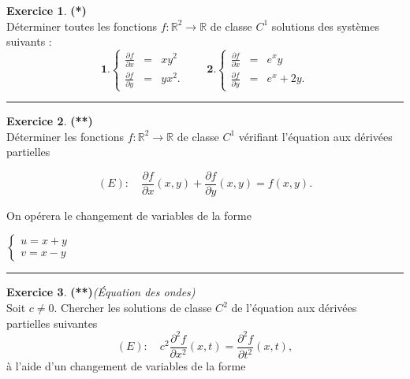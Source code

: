 \documentclass[a4paper,11pt]{article}
\theoremstyle{definition}
\newtheorem{exo}{Exercice} %
\begin{document}
\begin{minipage}{1\linewidth}\begin{minipage}[t]{0.48\linewidth}\raggedright

\begin{exo}\textbf{(*)}\quad\\[0.2cm]
	Déterminer toutes les fonctions $f:\mathbb R^2\to\mathbb R$ de classe $C^1$ solutions des systèmes suivants :
	$$
	\mathbf 1.\left\{
	\begin{array}{rcl}
	\displaystyle \frac{\partial f}{\partial x}&=&xy^2\\[3mm]
	\displaystyle \frac{\partial f}{\partial y}&=&yx^2.
	\end{array}\right.
	\quad\quad
	\mathbf 2.\left\{
	\begin{array}{rcl}
	\displaystyle \frac{\partial f}{\partial x}&=&e^xy\\[3mm]
	\displaystyle \frac{\partial f}{\partial y}&=&e^x+2y.
	\end{array}\right.
	$$
	
	
	
	\centering\rule{1\linewidth}{0.6pt}\end{exo}


\begin{exo}\textbf{(**)}\quad\\[0.2cm]
	Déterminer les fonctions $f:\mathbb R^2\to\mathbb R$ de classe $C^1$ vérifiant l'équation aux dérivées partielles
	
	$$(E):\quad \frac{\partial f}{\partial x}(x,y)+\frac{\partial f}{\partial y}(x,y) =  f(x,y).$$
	
	 On opérera le changement de variables de la forme 
	 
	 $\left\{\begin{array}{l}
	 u = x+y\\v=x-y
	 \end{array}\right.$
	\centering\rule{1\linewidth}{0.6pt}\end{exo}






\end{minipage}\hfill\vrule\hfill\begin{minipage}[t]{0.48\linewidth}\raggedright

\begin{exo}\textbf{(**)}\quad\textit{(Équation des ondes)}\\[0.2cm]
	Soit $c\neq 0$. Chercher les solutions de classe $C^2$ de l'équation aux dérivées partielles suivantes 
	$$(E):\quad c^2\frac{\partial^2 f}{\partial x^2}(x,t)=\frac{\partial^2 f}{\partial t^2}(x,t),$$
	à l'aide d'un changement de variables de la forme 
	

\end{exo}
\end{minipage}
\end{minipage}
\end{document}
